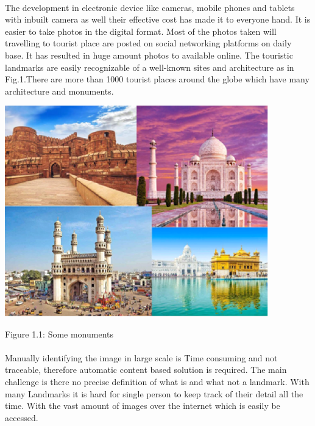 \documentclass[10pt]{article} %
\begin{document}
\paragraph{}
\justifying
\begin{spacing}{1.5} The development in electronic device like cameras, mobile phones and tablets with inbuilt camera as well their effective cost has made it to everyone hand. It is easier to take photos in the digital format. Most of the photos taken will travelling to tourist place are posted on social networking platforms on daily base. It has resulted in huge amount photos to available online. The touristic landmarks are easily recognizable of a well-known sites and architecture as in Fig.1.There are more than 1000 tourist places around the globe which have many architecture and monuments.  
 
\vspace{5mm}

\noindent \includegraphics*[width=4.5in, height=3.6in, keepaspectratio=false]{image3}

\noindent Figure 1.1: Some monuments
\paragraph{}
\justifying
\noindent Manually identifying the image in large scale is Time consuming and not traceable, therefore automatic content based solution is required. The main challenge is there no precise definition of what is and what not a landmark. With many Landmarks it is hard for single person to keep track of their detail all the time. With the vast amount of images over the internet which is easily be accessed.


\end{spacing}
\end{document}
